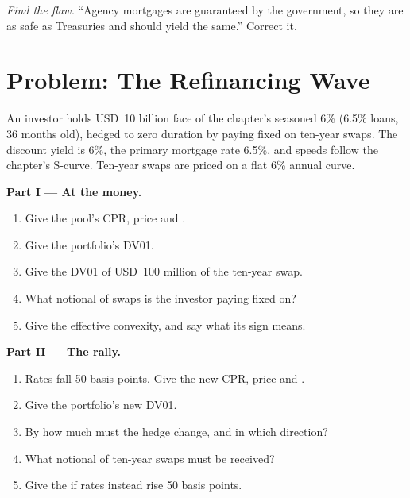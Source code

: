 \begin{exercise}[$\star\star\star$]\label{exo:m2:mortgages-and-agencies:8}
\emph{Find the flaw.} ``Agency mortgages are guaranteed by the government,
so they are as safe as Treasuries and should yield the same.'' Correct it.
\end{exercise}

\section{Problem: The Refinancing Wave}

\begin{problem}\label{pb:m2:mortgages-and-agencies:1}
An investor holds USD~10 billion face of the chapter's seasoned 6\%
 (6.5\% loans, 36 months old), hedged to zero duration by paying
fixed on ten-year swaps. The discount yield is 6\%, the primary mortgage rate
6.5\%, and speeds follow the chapter's S-curve. Ten-year swaps are priced on a
flat 6\% annual curve.

\medskip\noindent\textbf{Part I --- At the money.}
\begin{enumerate}
\item Give the pool's CPR, price and .
\item Give the portfolio's DV01.
\item Give the DV01 of USD~100 million of the ten-year swap.
\item What notional of swaps is the investor paying fixed on?
\item Give the effective convexity, and say what its sign means.
\end{enumerate}

\medskip\noindent\textbf{Part II --- The rally.}
\begin{enumerate}[resume]
\item Rates fall 50 basis points. Give the new CPR, price and .
\item Give the portfolio's new DV01.
\item By how much must the hedge change, and in which direction?
\item What notional of ten-year swaps must be received?
\item Give the  if rates instead rise 50 basis points.
\end{enumerate}


\end{problem}
